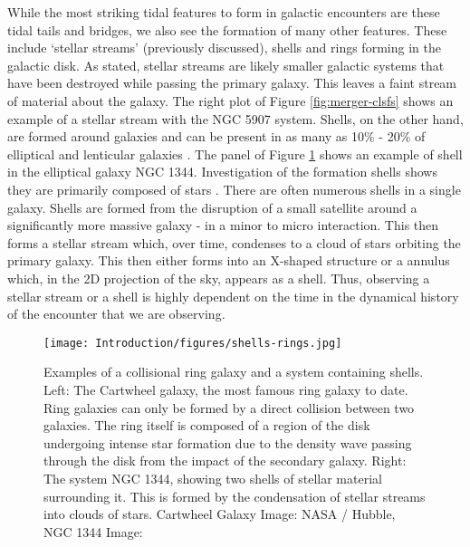 While the most striking tidal features to form in galactic encounters are these tidal tails and bridges, we also see the formation of many other features. These include `stellar streams' (previously discussed), shells and rings forming in the galactic disk. As stated, stellar streams are likely smaller galactic systems that have been destroyed while passing the primary galaxy. This leaves a faint stream of material about the galaxy. The right plot of Figure \ref{fig:merger-clsfs} shows an example of a stellar stream with the NGC 5907 system. Shells, on the other hand, are formed around galaxies and can be present in as many as 10\% - 20\% of elliptical and lenticular galaxies \citep{1983ApJ...274..534M, 2013ApJ...765...28A}. The \DIFdelbegin {}\DIFdelend \DIFaddbegin {}\DIFaddend panel of Figure \ref{fig:tidal-features-ex} shows an example of shell in the elliptical galaxy NGC 1344. Investigation of the formation shells shows they are primarily composed of stars \citep{1984ApJ...279..596Q}. There are often numerous shells in a single galaxy. Shells are formed from the disruption of a small satellite around a significantly more massive galaxy - \DIFdelbegin {}\DIFdelend \DIFaddbegin {}\DIFaddend in a minor to micro interaction. This then forms a stellar stream which, over time, condenses to a cloud of stars orbiting the primary galaxy. This then either forms into an X-shaped structure or a annulus which, in the 2D projection of the sky, appears as a shell. Thus, observing a stellar stream or a shell is highly dependent on the time in the dynamical history of the encounter that we are observing.

\begin{figure}
\centering
\texttt{[image: Introduction/figures/shells-rings.jpg]}
\caption[Examples of a collisional ring galaxy and a system containing shells.]{Examples of a collisional ring galaxy and a system containing shells. Left: The Cartwheel galaxy, the most famous ring galaxy to date. Ring galaxies can only be formed by a direct collision between two galaxies. The ring itself is composed of a region of the disk undergoing intense star formation due to the density wave passing through the disk from the impact of the secondary galaxy. Right: The system NGC 1344, showing two shells of stellar material surrounding it. This is formed by the condensation of stellar streams into clouds of stars. Cartwheel Galaxy Image: NASA / Hubble, NGC 1344 Image: \citet{1983ApJ...274..534M}}
\label{fig:tidal-features-ex}
\end{figure}

